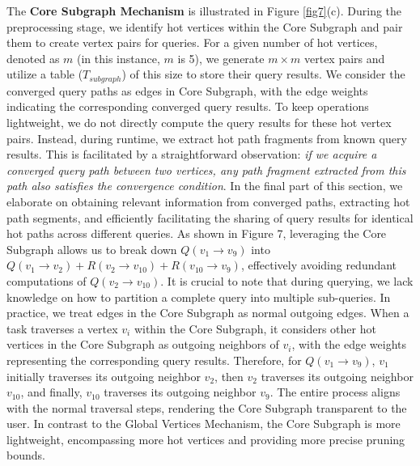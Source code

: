 \documentclass[10pt,journal,compsoc]{IEEEtran}
\begin{document}
The {\bf{Core Subgraph Mechanism}} is illustrated in Figure \ref{fig7}(c). During the preprocessing stage, we identify hot vertices within the Core Subgraph and pair them to create vertex pairs for queries. For a given number of hot vertices, denoted as $m$ (in this instance, $m$ is 5), we generate $m \times m$ vertex pairs and utilize a table ($T_{subgraph}$) of this size to store their query results. We consider the converged query paths as edges in Core Subgraph, with the edge weights indicating the corresponding converged query results.
To keep operations lightweight, we do not directly compute the query results for these hot vertex pairs. Instead, during runtime, we extract hot path fragments from known query results. This is facilitated by a straightforward observation: \textit{if we acquire a converged query path between two vertices, any path fragment extracted from this path also satisfies the convergence condition}.
In the final part of this section, we elaborate on obtaining relevant information from converged paths, extracting hot path segments, and efficiently facilitating the sharing of query results for identical hot paths across different queries. As shown in Figure 7, leveraging the Core Subgraph allows us to break down $Q(v_1\rightarrow v_9)$ into $Q(v_1\rightarrow v_2) + R(v_2\rightarrow v_{10}) + R(v_{10}\rightarrow v_9)$, effectively avoiding redundant computations of $Q(v_2\rightarrow v_{10})$.
It is crucial to note that during querying, we lack knowledge on how to partition a complete query into multiple sub-queries. In practice, we treat edges in the Core Subgraph as normal outgoing edges. When a task traverses a vertex $v_i$ within the Core Subgraph, it considers other hot vertices in the Core Subgraph as outgoing neighbors of $v_i$, with the edge weights representing the corresponding query results. Therefore, for $Q(v_1\rightarrow v_9)$, $v_1$ initially traverses its outgoing neighbor $v_2$, then $v_2$ traverses its outgoing neighbor $v_{10}$, and finally, $v_{10}$ traverses its outgoing neighbor $v_9$. The entire process aligns with the normal traversal steps, rendering the Core Subgraph transparent to the user.
In contrast to the Global Vertices Mechanism, the Core Subgraph is more lightweight, encompassing more hot vertices and providing more precise pruning bounds.
\end{document}
